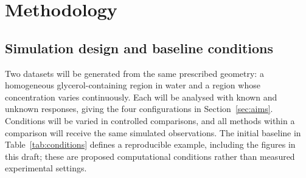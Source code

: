 \documentclass[11pt]{article}
\begin{document}
\clearpage

\section{Methodology}

\subsection{Simulation design and baseline conditions}

Two datasets will be generated from the same prescribed geometry: a homogeneous glycerol-containing region in water and a region whose concentration varies continuously. Each will be analysed with known and unknown responses, giving the four configurations in Section~\ref{sec:aims}. Conditions will be varied in controlled comparisons, and all methods within a comparison will receive the same simulated observations. The initial baseline in Table~\ref{tab:conditions} defines a reproducible example, including the figures in this draft; these are proposed computational conditions rather than measured experimental settings.
\end{document}

